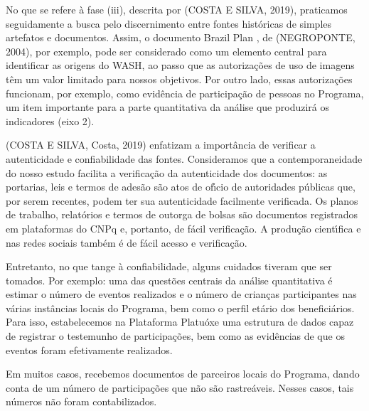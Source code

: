 \documentclass[
12pt,		%
openright,	%
twoside,  %
a4paper,			%
chapter=TITLE,		%
english,			%
french,				%
spanish,			%
brazil				%
]{USPSC-classe/USPSC}
\begin{document}
No que se refere \`a fase (iii), descrita por (COSTA E SILVA, 2019), praticamos seguidamente a busca pelo discernimento entre fontes hist\'oricas de simples artefatos e documentos. Assim, o documento \textquotedbl Brazil Plan \textquotedbl , de  (NEGROPONTE, 2004), por exemplo, pode ser considerado como um elemento central para identificar as origens do WASH, ao passo que as autoriza\c{c}\~oes de uso de imagens t\^em um valor limitado para nossos objetivos.  Por outro lado, essas autoriza\c{c}\~oes funcionam, por exemplo, como evid\^encia de participa\c{c}\~ao de pessoas no Programa, um item importante para a parte quantitativa da an\'alise que produzir\'a os indicadores (eixo 2).









(COSTA E SILVA, Costa, 2019) enfatizam a import\^ancia de verificar a autenticidade e confiabilidade das fontes. Consideramos que a contemporaneidade do nosso estudo facilita a verifica\c{c}\~ao da autenticidade dos documentos: as portarias, leis e termos de ades\~ao s\~ao atos de of\'{\i}cio de autoridades p\'ublicas que, por serem recentes, podem ter sua autenticidade facilmente verificada. Os planos de trabalho, relat\'orios e termos de outorga de bolsas s\~ao documentos registrados em plataformas do CNPq e, portanto, de f\'acil verifica\c{c}\~ao. A produ\c{c}\~ao cient\'{\i}fica e nas redes sociais tamb\'em \'e de f\'acil acesso e verifica\c{c}\~ao.









Entretanto, no que tange \`a confiabilidade, alguns cuidados tiveram que ser tomados. Por exemplo: uma das quest\~oes centrais da an\'alise quantitativa \'e estimar o n\'umero de eventos realizados e o n\'umero de crian\c{c}as participantes nas v\'arias inst\^ancias locais do Programa, bem como o perfil et\'ario dos benefici\'arios. Para isso, estabelecemos na Plataforma Platu\'oxe uma estrutura de dados capaz de registrar o testemunho de participa\c{c}\~oes, bem como as evid\^encias de que os eventos foram efetivamente realizados.









Em muitos casos, recebemos documentos de parceiros locais do Programa, dando conta de um n\'umero de participa\c{c}\~oes que n\~ao s\~ao rastre\'aveis. Nesses casos, tais n\'umeros n\~ao foram contabilizados.
\end{document}
